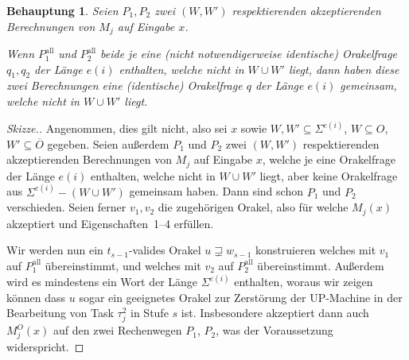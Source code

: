 \documentclass[nofonts]{uebung}
\newtheorem{claim}[theorem]{Behauptung}
\begin{document}
\begin{claim}
    Seien $P_1, P_2$ zwei $(W, W')$ respektierenden akzeptierenden Berechnungen von $M_j$ auf Eingabe $x$.

    Wenn $P^\mathrm{all}_1$ und $P^\mathrm{all}_2$ beide je eine (nicht notwendigerweise identische) Orakelfrage $q_1, q_2$ der Länge $e(i)$ enthalten, welche nicht in $W\cup W'$ liegt, dann haben diese zwei Berechnungen eine (identische) Orakelfrage $q$ der Länge $e(i)$ gemeinsam, welche nicht in $W\cup W'$ liegt.
\end{claim}
\begin{proof}[Skizze.]
    Angenommen, dies gilt nicht, also sei $x$ sowie $W,W'\subseteq \Sigma^{e(i)}$, $W\subseteq O$, $W'\subseteq\overline{O}$ gegeben.
    Seien außerdem $P_1$ und $P_2$ zwei $(W, W')$ respektierenden akzeptierenden Berechnungen von $M_j$ auf Eingabe $x$,
    welche je eine Orakelfrage der Länge $e(i)$ enthalten, welche nicht in $W\cup W'$ liegt,
    aber keine Orakelfrage aus $\Sigma^{e(i)}-(W\cup W')$ gemeinsam haben.
    Dann sind schon $P_1$ und $P_2$ verschieden.
    Seien ferner $v_1, v_2$ die zugehörigen Orakel, also für welche $M_j(x)$ akzeptiert und Eigenschaften~1--4 erfüllen.

    Wir werden nun ein $t_{s-1}$-valides Orakel $u\sqsupsetneq w_{s-1}$ konstruieren welches mit $v_1$ auf $P^\mathrm{all}_1$ übereinstimmt, und welches mit $v_2$ auf $P^\mathrm{all}_2$ übereinstimmt.
    Außerdem wird es mindestens ein Wort der Länge $\Sigma^{e(i)}$ enthalten, woraus wir zeigen können dass $u$ sogar ein geeignetes Orakel zur Zerstörung der UP-Machine in der Bearbeitung von Task $\tau^2_{j}$ in Stufe $s$ ist. Insbesondere akzeptiert dann auch $M_j^O(x)$ auf den zwei Rechenwegen $P_1$, $P_2$, was der Voraussetzung widerspricht.


\end{proof}
\end{document}
